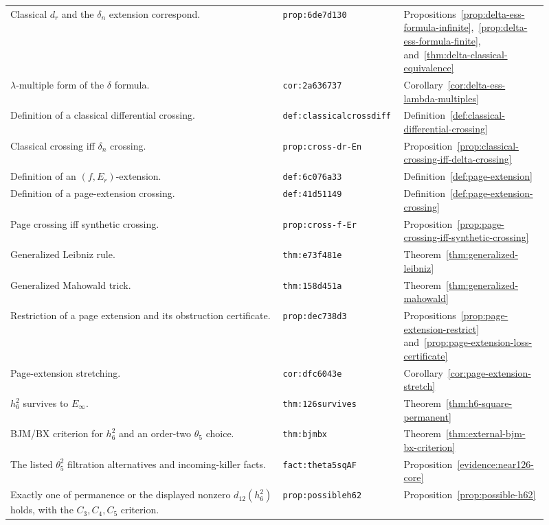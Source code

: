 \begin{center}
\begin{tabular}{p{0.49\linewidth}p{0.17\linewidth}p{0.25\linewidth}}
Classical $d_r$ and the $\delta_n$ extension correspond. & \texttt{prop:6de7d130} & Propositions~\ref{prop:delta-ess-formula-infinite},~\ref{prop:delta-ess-formula-finite}, and~\ref{thm:delta-classical-equivalence} \\
$\lambda$-multiple form of the $\delta$ formula. & \texttt{cor:2a636737} & Corollary~\ref{cor:delta-ess-lambda-multiples} \\
Definition of a classical differential crossing. & \texttt{def:classicalcrossdiff} & Definition~\ref{def:classical-differential-crossing} \\
Classical crossing iff $\delta_n$ crossing. & \texttt{prop:cross-dr-En} & Proposition~\ref{prop:classical-crossing-iff-delta-crossing} \\
Definition of an $(f,E_r)$-extension. & \texttt{def:6c076a33} & Definition~\ref{def:page-extension} \\
Definition of a page-extension crossing. & \texttt{def:41d51149} & Definition~\ref{def:page-extension-crossing} \\
Page crossing iff synthetic crossing. & \texttt{prop:cross-f-Er} & Proposition~\ref{prop:page-crossing-iff-synthetic-crossing} \\
Generalized Leibniz rule. & \texttt{thm:e73f481e} & Theorem~\ref{thm:generalized-leibniz} \\
Generalized Mahowald trick. & \texttt{thm:158d451a} & Theorem~\ref{thm:generalized-mahowald} \\
Restriction of a page extension and its obstruction certificate. & \texttt{prop:dec738d3} & Propositions~\ref{prop:page-extension-restrict} and~\ref{prop:page-extension-loss-certificate} \\
Page-extension stretching. & \texttt{cor:dfc6043e} & Corollary~\ref{cor:page-extension-stretch} \\
$h_6^2$ survives to $E_\infty$. & \texttt{thm:126survives} & Theorem~\ref{thm:h6-square-permanent} \\
BJM/BX criterion for $h_6^2$ and an order-two $\theta_5$ choice. & \texttt{thm:bjmbx} & Theorem~\ref{thm:external-bjm-bx-criterion} \\
The listed $\theta_5^2$ filtration alternatives and incoming-killer facts. & \texttt{fact:theta5sqAF} & Proposition~\ref{evidence:near126-core} \\
Exactly one of permanence or the displayed nonzero $d_{12}(h_6^2)$ holds, with the $C_3,C_4,C_5$ criterion. & \texttt{prop:possibleh62} & Proposition~\ref{prop:possible-h62} \\

\end{tabular}
\end{center}

